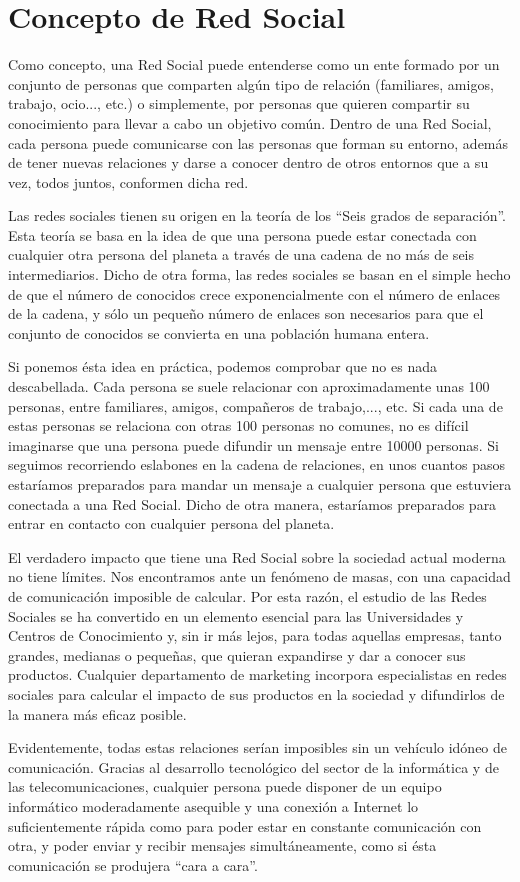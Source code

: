 \section{Concepto de Red Social}
Como concepto, una Red Social puede entenderse como un ente formado por un conjunto de personas que comparten algún tipo de relación (familiares, amigos, trabajo, ocio..., etc.) o simplemente, por personas que quieren compartir su conocimiento para llevar a cabo un objetivo común. Dentro de una Red Social, cada persona puede comunicarse con las personas que forman su entorno, además de tener nuevas relaciones y darse a conocer dentro de otros entornos que a su vez, todos juntos, conformen dicha red.
\bigskip
\par
Las redes sociales tienen su origen en la teoría de los “Seis grados de separación”. Esta teoría se basa en la idea de que una persona puede estar conectada con cualquier otra persona del planeta a través de una cadena de no más de seis intermediarios. Dicho de otra forma, las redes sociales se basan en el simple hecho de que el número de conocidos crece exponencialmente con el número de enlaces de la cadena, y sólo un pequeño número de enlaces son necesarios para que el conjunto de conocidos se convierta en una población humana entera.
\bigskip
\par
Si ponemos ésta idea en práctica, podemos comprobar que no es nada descabellada. Cada persona se suele relacionar con aproximadamente unas 100 personas, entre familiares, amigos, compañeros de trabajo,..., etc. Si cada una de estas personas se relaciona con otras 100 personas no comunes, no es difícil imaginarse que una persona puede difundir un mensaje entre 10000 personas. Si seguimos recorriendo eslabones en la cadena de relaciones, en unos cuantos pasos estaríamos preparados para mandar un mensaje a cualquier persona que estuviera conectada a una Red Social. Dicho de otra manera, estaríamos preparados para
entrar en contacto con cualquier persona del planeta.
\bigskip
\par
El verdadero impacto que tiene una Red Social sobre la sociedad actual moderna no tiene límites. Nos encontramos ante un fenómeno de masas, con una capacidad de comunicación imposible de calcular. Por esta razón, el estudio de las Redes Sociales se ha
convertido en un elemento esencial para las Universidades y Centros de Conocimiento y, sin ir más lejos, para todas aquellas empresas, tanto grandes, medianas o pequeñas, que quieran expandirse y dar a conocer sus productos. Cualquier departamento de marketing incorpora especialistas en redes sociales para calcular el impacto de sus productos en la sociedad y difundirlos de la manera más eficaz posible.
\bigskip
\par
Evidentemente, todas estas relaciones serían imposibles sin un vehículo idóneo de comunicación. Gracias al desarrollo tecnológico del sector de la informática y de las telecomunicaciones, cualquier persona puede disponer de un equipo informático
moderadamente asequible y una conexión a Internet lo suficientemente rápida como para poder estar en constante comunicación con otra, y poder enviar y recibir mensajes simultáneamente, como si ésta comunicación se produjera “cara a cara”.
